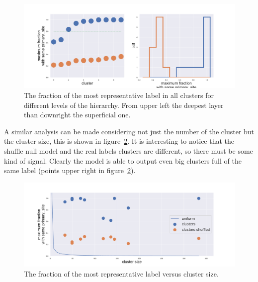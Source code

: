 \begin{figure}[htb!]
\begin{minipage}{0.45\textwidth}
    \end{minipage}
    \hspace{3mm}
    \begin{minipage}{0.45\textwidth}
    \includegraphics[width=0.9\linewidth]{pictures/topic/gtex/oversigma_10tissue/shuffledcluster_maximum_l3_primary_site.pdf}
    \end{minipage}
    \caption{The fraction of the most representative label in all clusters for different levels of the hierarchy. From upper left the deepest layer than downright the superficial one.}
    \label{fig:topic/gtex/oversigma_10tissue/shuffledcluster_maximum*}
\end{figure}
\FloatBarrier
A similar analysis can be made considering not just the number of the cluster but the cluster size, this is shown in figure~\ref{fig:topic/gtex/oversigma_10tissue/shuffledclusterhomosize_l3_primary_site}. It is interesting to notice that the shuffle null model and the real labels clusters are different, so there must be some kind of signal. Clearly the model is able to output even big clusters full of the same label (points upper right in figure~\ref{fig:topic/gtex/oversigma_10tissue/shuffledclusterhomosize_l3_primary_site}).
\begin{figure}[htb!]
	\centering
	\includegraphics[width=0.9\linewidth]{pictures/topic/gtex/oversigma_10tissue/shuffledclusterhomosize_l3_primary_site.pdf}
	\caption{The fraction of the most representative label versus cluster size.}
	\label{fig:topic/gtex/oversigma_10tissue/shuffledclusterhomosize_l3_primary_site}
\end{figure}
